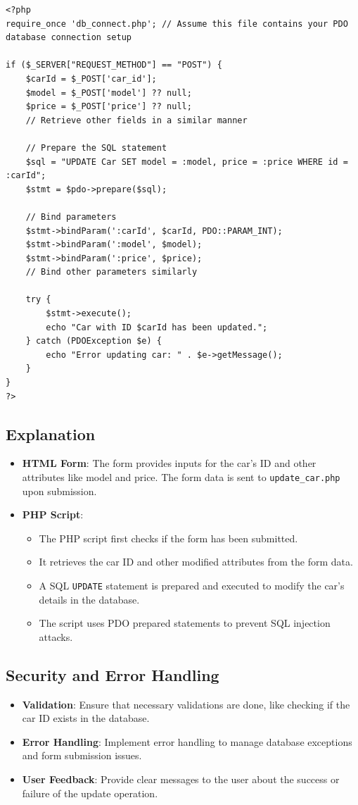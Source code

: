 \documentclass[11pt]{article}
\begin{document}
\begin{verbatim}
<?php
require_once 'db_connect.php'; // Assume this file contains your PDO database connection setup

if ($_SERVER["REQUEST_METHOD"] == "POST") {
    $carId = $_POST['car_id'];
    $model = $_POST['model'] ?? null;
    $price = $_POST['price'] ?? null;
    // Retrieve other fields in a similar manner

    // Prepare the SQL statement
    $sql = "UPDATE Car SET model = :model, price = :price WHERE id = :carId";
    $stmt = $pdo->prepare($sql);

    // Bind parameters
    $stmt->bindParam(':carId', $carId, PDO::PARAM_INT);
    $stmt->bindParam(':model', $model);
    $stmt->bindParam(':price', $price);
    // Bind other parameters similarly

    try {
        $stmt->execute();
        echo "Car with ID $carId has been updated.";
    } catch (PDOException $e) {
        echo "Error updating car: " . $e->getMessage();
    }
}
?>
\end{verbatim}

\subsection{Explanation}
\label{sec:orgab4ce6c}
\begin{itemize}
\item \textbf{HTML Form}: The form provides inputs for the car's ID and other
attributes like model and price. The form data is sent to
\texttt{update\_car.php} upon submission.
\item \textbf{PHP Script}:

\begin{itemize}
\item The PHP script first checks if the form has been submitted.
\item It retrieves the car ID and other modified attributes from the form
data.
\item A SQL \texttt{UPDATE} statement is prepared and executed to modify the
car's details in the database.
\item The script uses PDO prepared statements to prevent SQL injection
attacks.
\end{itemize}
\end{itemize}

\subsection{Security and Error Handling}
\label{sec:orge8461f2}
\begin{itemize}
\item \textbf{Validation}: Ensure that necessary validations are done, like
checking if the car ID exists in the database.
\item \textbf{Error Handling}: Implement error handling to manage database
exceptions and form submission issues.
\item \textbf{User Feedback}: Provide clear messages to the user about the success
or failure of the update operation.
\end{itemize}
\end{document}
